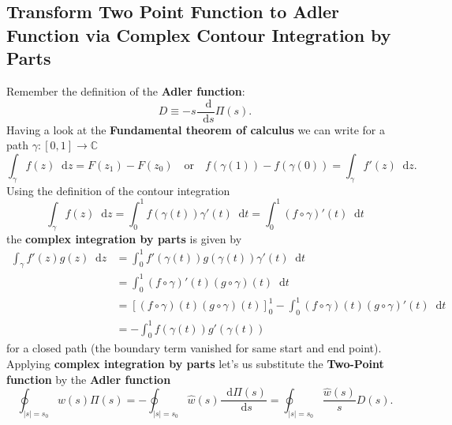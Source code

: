 \documentclass[11pt,a4paper]{article}
\newcommand*\diff{\mathop{}\!\mathrm{d}}
\begin{document}
\subsection{Transform Two Point Function to Adler Function via Complex Contour Integration by Parts}
Remember the definition of the \textbf{Adler function}:
\begin{equation}
	D \equiv - s \frac{\diff}{\diff s} \Pi(s).
\end{equation}
Having a look at the \textbf{Fundamental theorem of calculus} we can write for a path $\gamma:[0,1]\to\mathbb{C}$
\begin{equation}
	\int_\gamma f(z) \diff z = F(z_1) - F(z_0) \quad \text{or} \quad f(\gamma(1)) - f(\gamma(0)) = \int_\gamma f'(z) \diff z.
\end{equation}
Using the definition of the contour integration
\begin{equation}
	\int_\gamma f(z) \diff z = \int_0^1 f(\gamma(t)) \gamma'(t) \diff t = \int_0^1 (f \circ \gamma)'(t) \diff t
\end{equation}
the \textbf{complex integration by parts} is given by
\begin{equation}
	\begin{split}
		\int_{\gamma} f'(z) g(z) \diff z &= \int_{0}^{1} f'(\gamma(t)) g(\gamma(t)) \gamma'(t) \diff t \\
		&= \int_{0}^1 (f \circ \gamma)'(t) (g\circ\gamma)(t) \diff t \\
		&= \left[(f\circ\gamma)(t) (g\circ\gamma)(t) \right]_0^1 - \int_0^1 (f\circ\gamma)(t)(g\circ\gamma)'(t)\diff t \\
		&= -\int_0^1 f(\gamma(t))g'(\gamma(t))
	\end{split}
\end{equation}
for a closed path (the boundary term vanished for same start and end point).
Applying \textbf{complex integration by parts} let's us substitute the \textbf{Two-Point function} by the \textbf{Adler function}
\begin{equation}
	\oint_{|s|=s_0} w(s) \Pi(s) = -\oint_{|s|=s_0} \hat w(s) \frac{\diff \Pi(s)}{\diff s} = \oint_{|s|=s_0} \frac{\hat w(s)}{s} D(s).
\end{equation}
\end{document}
